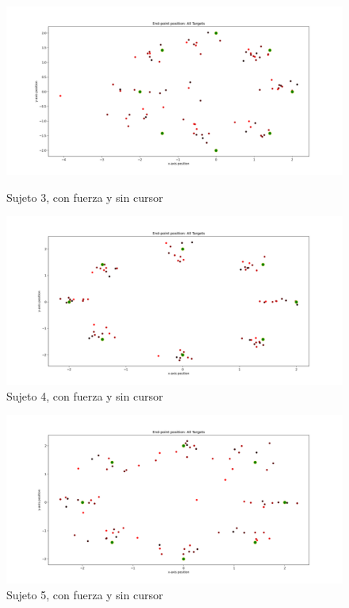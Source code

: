 \documentclass[a4paper,11pt, oneside]{book}
\begin{document}
\begin{figure}[H]
	\begin{minipage}[b]{0.5\linewidth}
		\centering
		\includegraphics[width=\linewidth]{sujeto3/force_no_cursor/trayectorias_puntos}
		\caption{Sujeto 3, con fuerza y sin cursor}
		\label{fig:figura1}
	\end{minipage}
	\hspace{0.5cm}
	\begin{minipage}[b]{0.5\linewidth}
		\centering
		\includegraphics[width=\linewidth]{sujeto4/force_no_cursor/trayectorias_puntos}
		\caption{Sujeto 4, con fuerza y sin cursor}
		\label{fig:figura2}
	\end{minipage}
\end{figure}
\begin{figure}[H]
	\begin{minipage}[b]{0.5\linewidth}
		\centering
		\includegraphics[width=\linewidth]{sujeto5/force_no_cursor/trayectorias_puntos}
		\caption{Sujeto 5, con fuerza y sin cursor}
		\label{fig:figura1}
	\end{minipage}
\end{figure}
\end{document}
